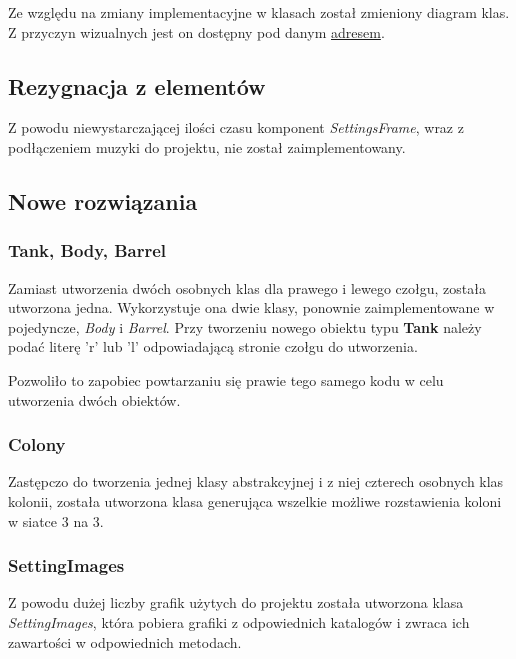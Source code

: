 \documentclass[a4paper]{article}
\begin{document}
\quad Ze wzgl\k{e}du na zmiany implementacyjne w klasach zosta\l{} zmieniony diagram klas. Z przyczyn wizualnych jest on dost\k{e}pny pod danym \href{https://drive.google.com/file/d/1BycxHSp0vN6H3-6hj7EW1VBEZAAbxgBE/view?usp=sharing}{adresem}.

\subsection{Rezygnacja z element\'ow}

\quad Z powodu niewystarczaj\k{a}cej ilo\'sci czasu komponent \textit{SettingsFrame}, wraz z pod\l{}\k{a}czeniem muzyki do projektu, nie zosta\l{} zaimplementowany.

\subsection{Nowe rozwi\k{a}zania}

\subsubsection{Tank, Body, Barrel}
\quad Zamiast utworzenia dw\'och osobnych klas dla prawego i lewego czo\l{}gu, zosta\l{}a utworzona jedna.
Wykorzystuje ona dwie klasy, ponownie zaimplementowane w pojedyncze, \textit{Body} i \textit{Barrel}.
Przy tworzeniu nowego obiektu typu \textbf{Tank} nale\.zy poda\'c liter\k{e} 'r' lub 'l' odpowiadaj\k{a}c\k{a} stronie czo\l{}gu do utworzenia.

Pozwoli\l{}o to zapobiec powtarzaniu si\k{e} prawie tego samego kodu w celu utworzenia dw\'och obiekt\'ow.

\subsubsection{Colony}
\quad Zast\k{e}pczo do tworzenia jednej klasy abstrakcyjnej i z niej czterech osobnych klas kolonii, zosta\l{}a utworzona klasa generuj\k{a}ca wszelkie mo\.zliwe rozstawienia koloni w siatce 3 na 3.

\subsubsection{SettingImages}
\quad Z powodu du\.zej liczby grafik u\.zytych do projektu zosta\l{}a utworzona klasa \textit{SettingImages}, kt\'ora pobiera grafiki z odpowiednich katalog\'ow i zwraca ich zawarto\'sci w odpowiednich metodach.
\end{document}
